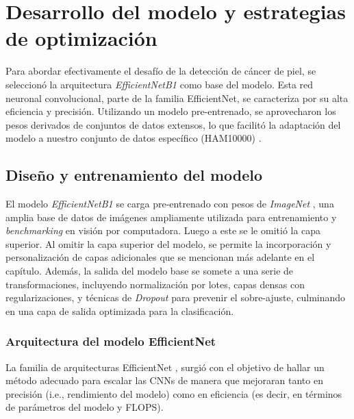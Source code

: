 \section{Desarrollo del modelo y estrategias de optimización}\label{sec:method}

Para abordar efectivamente el desafío de la detección de cáncer de piel, se seleccionó la arquitectura \textit{EfficientNetB1}  como base del modelo. Esta red neuronal convolucional, parte de la familia EfficientNet, se caracteriza por su alta eficiencia y precisión. Utilizando un modelo pre-entrenado, se aprovecharon los pesos derivados de conjuntos de datos extensos, lo que facilitó la adaptación del modelo a nuestro conjunto de datos específico (HAM10000) .

\subsection{Diseño y entrenamiento del modelo}

El modelo \textit{EfficientNetB1} se carga pre-entrenado con pesos de \textit{ImageNet} , una amplia base de datos de imágenes ampliamente utilizada para entrenamiento y \textit{benchmarking} en visión por computadora. Luego a este se le omitió la capa superior. Al omitir la capa superior del modelo, se permite la incorporación y personalización de capas adicionales que se mencionan más adelante en el capítulo. Además, la salida del modelo base se somete a una serie de transformaciones, incluyendo normalización por lotes, capas densas con regularizaciones, y técnicas de \textit{Dropout} para prevenir el sobre-ajuste, culminando en una capa de salida optimizada para la clasificación.

\subsubsection{Arquitectura del modelo EfficientNet}
   
La familia de arquitecturas EfficientNet , surgió con el objetivo de hallar un método adecuado para escalar las CNNs de manera que mejoraran tanto en precisión (i.e., rendimiento del modelo) como en eficiencia (es decir, en términos de parámetros del modelo y FLOPS). 


